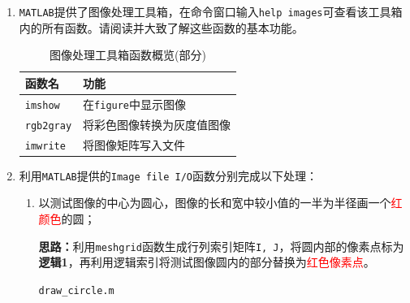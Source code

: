 \documentclass{article}
\numberwithin{figure}{section}
\numberwithin{table}{section}
\numberwithin{listing}{section}
\numberwithin{equation}{section}
\begin{document}
        \begin{enumerate}
            \item \texttt{MATLAB}提供了图像处理工具箱，在命令窗口输入\texttt{help images}可查看该工具箱内的所有函数。请阅读并大致了解这些函数的基本功能。

                \begin{table}[H]
                    \caption{图像处理工具箱函数概览(部分)}
                    \label{tab:help_images}
                    \centering
                
                    \begin{tabular}{l|l}
                    \hline
                
                    \hline
                    \textbf{函数名} & \textbf{功能} \\
                    \hline
                        \texttt{imshow} & 在\texttt{figure}中显示图像 \\
                    \hline
                        \texttt{rgb2gray} & 将彩色图像转换为灰度值图像 \\
                    \hline
                        \texttt{imwrite} & 将图像矩阵写入文件 \\
                
                    \hline
                    \end{tabular}
                \end{table}

            \item 利用\texttt{MATLAB}提供的\texttt{Image file I/O}函数分别完成以下处理：
                \begin{enumerate}
                    \item 以测试图像的中心为圆心，图像的长和宽中较小值的一半为半径画一个\textcolor{red}{红颜色}的圆；

                        \textbf{思路：}利用\texttt{meshgrid}函数生成行列索引矩阵\texttt{I, J}，将圆内部的像素点标为\textbf{逻辑1}，再利用逻辑索引将测试图像圆内的部分替换为\textcolor{red}{红色像素点}。

                        \begin{listing}[H]
                            \caption{\texttt{draw\_circle.m}}
                            \label{listing:draw_circle}
                            \inputminted{matlab}{../draw_circle.m}
                        \end{listing}


\end{enumerate}
\end{enumerate}
\end{document}
